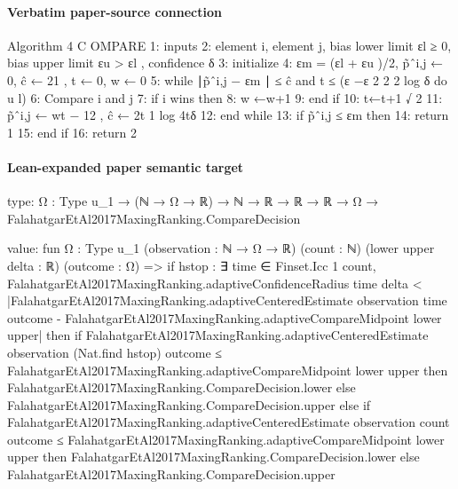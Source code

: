 \documentclass[10pt]{article}
\begin{document}
\paragraph{Verbatim paper-source connection}
\begin{ReviewVerbatim}
Algorithm 4 C OMPARE
 1: inputs
 2:    element i, element j, bias lower limit εl ≥ 0, bias upper limit εu > εl , confidence δ
 3: initialize
 4:    εm = (εl + εu )/2, p̃ˆi,j ← 0, ĉ ← 21 , t ← 0, w ← 0
 5: while ∣p̃ˆi,j − εm ∣ ≤ ĉ and t ≤ (ε −ε
                                          2            2
                                                 2 log δ do
                                        u     l)
 6:     Compare i and j
 7:     if i wins then
 8:          w ←w+1
 9:     end if
10:     t←t+1                  √
                                            2
11:     p̃ˆi,j ← wt − 12 , ĉ ← 2t
                                 1
                                    log 4tδ
12: end while
13: if p̃ˆi,j ≤ εm then
14:     return 1
15: end if
16: return 2
\end{ReviewVerbatim}



\paragraph{Lean-expanded paper semantic target}
\begin{ReviewVerbatim}
type:
{Ω : Type u_1} → (ℕ → Ω → ℝ) → ℕ → ℝ → ℝ → ℝ → Ω → FalahatgarEtAl2017MaxingRanking.CompareDecision

value:
fun {Ω : Type u_1} (observation : ℕ → Ω → ℝ) (count : ℕ) (lower upper delta : ℝ) (outcome : Ω) =>
  if hstop :
      ∃ time ∈ Finset.Icc 1 count,
        FalahatgarEtAl2017MaxingRanking.adaptiveConfidenceRadius time delta <
          |FalahatgarEtAl2017MaxingRanking.adaptiveCenteredEstimate observation time outcome -
              FalahatgarEtAl2017MaxingRanking.adaptiveCompareMidpoint lower upper| then
    if
        FalahatgarEtAl2017MaxingRanking.adaptiveCenteredEstimate observation (Nat.find hstop) outcome ≤
          FalahatgarEtAl2017MaxingRanking.adaptiveCompareMidpoint lower upper then
      FalahatgarEtAl2017MaxingRanking.CompareDecision.lower
    else FalahatgarEtAl2017MaxingRanking.CompareDecision.upper
  else
    if
        FalahatgarEtAl2017MaxingRanking.adaptiveCenteredEstimate observation count outcome ≤
          FalahatgarEtAl2017MaxingRanking.adaptiveCompareMidpoint lower upper then
      FalahatgarEtAl2017MaxingRanking.CompareDecision.lower
    else FalahatgarEtAl2017MaxingRanking.CompareDecision.upper
\end{ReviewVerbatim}
\end{document}
